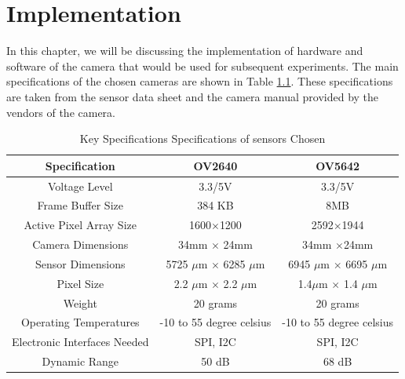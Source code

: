 \chapter{Implementation}
In this chapter, we will be discussing the implementation of hardware and software of the camera that would be used for subsequent experiments.
The main specifications of the chosen cameras are shown in Table \ref{tbl:camera_specs}. These specifications are taken from the sensor data sheet and the camera manual provided by the vendors of the camera\cite{OV2640Arducam}\cite{OV5642Arducam}\cite{OV2640DS}\cite{OV5642DS}.  
\begin{table}[]
\centering
\caption{ Key Specifications Specifications of sensors Chosen}
\label{tbl:camera_specs}
\begin{tabular}{|c|c|c|}
\hline
Specification & OV2640 &  OV5642 \\
\hline
Voltage Level & 3.3/5V &  3.3/5V\\
 \hline
Frame Buffer Size & 384 KB & 8MB \\
 \hline
 Active Pixel Array Size& 1600$\times$1200&  2592$\times$1944 \\
 \hline  
 Camera Dimensions & 34mm $\times$ 24mm & 34mm $\times$24mm\\
 \hline
 Sensor Dimensions & 5725 $\mu$m $\times$ 6285 $\mu$m& 6945 $\mu$m $\times$ 6695 $\mu$m\\
 \hline
 Pixel Size & 2.2 $\mu$m $\times$ 2.2 $\mu$m & 1.4$\mu$m $\times$ 1.4 $\mu$m\\
 \hline
 Weight & 20 grams & 20 grams \\
 \hline
 Operating Temperatures & -10 to 55 degree celsius & -10 to 55 degree celsius \\
 \hline
 Electronic Interfaces Needed & SPI, I2C & SPI, I2C\\
 \hline
 Dynamic Range & 50 dB & 68 dB \\
 \hline
\end{tabular}
\end{table}
